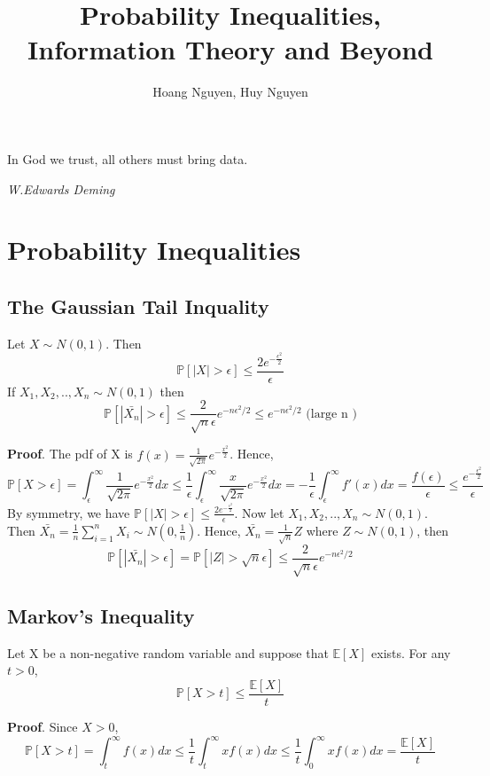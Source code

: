 \documentclass[10pt]{article}
\begin{document}
\title{Probability Inequalities, Information Theory and Beyond}
\author{Hoang Nguyen, Huy Nguyen}
\maketitle

\epigraph{In God we trust, all others must bring data.}{\textit{W.Edwards Deming}}

\section{Probability Inequalities}
\subsection*{The Gaussian Tail Inquality} Let $X \sim N(0,1)$. Then
\[ \mathbb{P}[|X|> \epsilon] \leqslant \frac{2e^{-\frac{\epsilon^2}{2}}}{\epsilon}\]
If $X_1, X_2,..,X_n \sim N(0,1)$ then
\[ \mathbb{P}[|\bar{X_n}| > \epsilon] \leqslant \frac{2}{\sqrt{n} \epsilon}e^{-n\epsilon^2/2 } \leqslant e^{-n\epsilon^2/2} \text{ (large n )}\]

\textbf{Proof}. The pdf of X is $f(x) = \frac{1}{\sqrt{2\pi}}e^{-\frac{x^2}{2}}$. Hence,
\[\mathbb{P}[X > \epsilon] = \int_{\epsilon}^{\infty}\frac{1}{\sqrt{2\pi}}e^{-\frac{x^2}{2}}dx \leqslant \frac{1}{\epsilon} \int_{\epsilon}^{\infty}\frac{x}{\sqrt{2\pi}}e^{-\frac{x^2}{2}}dx = -\frac{1}{\epsilon} \int_{\epsilon}^{\infty} f'(x)dx = \frac{f(\epsilon)}{\epsilon} \leqslant \frac{e^{-\frac{\epsilon^2}{2}}}{\epsilon}\]
By symmetry, we have $\mathbb{P}[|X|> \epsilon] \leqslant \frac{2e^{-\frac{\epsilon^2}{2}}}{\epsilon}$.
Now let $X_1, X_2,..,X_n \sim N(0,1)$. Then $\bar{X_n}=\frac{1}{n}\sum_{i=1}^{n}X_{i} \sim N(0, \frac{1}{n})$. Hence, $\bar{X_n} = \frac{1}{\sqrt{n}}Z$ where $Z \sim N(0,1)$, then
\[\mathbb{P}[|\bar{X_n}| > \epsilon] = \mathbb{P}[|Z|> \sqrt{n} \epsilon] \leqslant \frac{2}{\sqrt{n} \epsilon} e^{-n\epsilon^2 /2} \]

\subsection*{Markov's Inequality}
Let X be a non-negative random variable and suppose that $\mathbb{E}[X]$ exists. For any $t > 0$,
\[ \mathbb{P}[X >t] \leqslant \frac{\mathbb{E}[X]}{t} \]

\textbf{Proof}. Since $X>0$,
\[ \mathbb{P}[X > t] = \int_{t}^{\infty}f(x)dx \leqslant \frac{1}{t} \int_{t}^{\infty}xf(x)dx \leqslant \frac{1}{t} \int_{0}^{\infty}xf(x)dx = \frac{\mathbb{E}[X]}{t}\]
\end{document}
